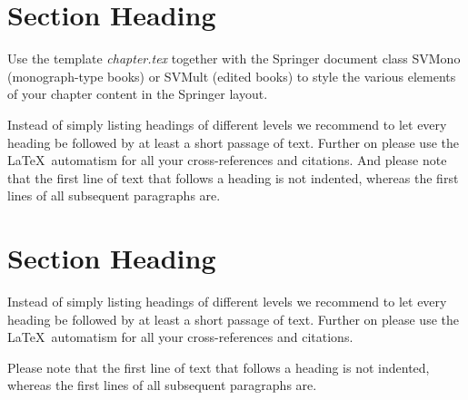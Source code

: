 
\section{Section Heading}
\label{g02:sec:1}
Use the template \emph{chapter.tex} together with the Springer document class SVMono (monograph-type books) or SVMult (edited books) to style the various elements of your chapter content in the Springer layout.

\cite{qca:mraz}


Instead of simply listing headings of different levels we recommend to let every heading be followed by at least a short passage of text. Further on please use the \LaTeX\ automatism for all your cross-references and citations. And please note that the first line of text that follows a heading is not indented, whereas the first lines of all subsequent paragraphs are.

\section{Section Heading}
\label{g02:sec:2}
Instead of simply listing headings of different levels we recommend to let every heading be followed by at least a short passage of text. Further on please use the \LaTeX\ automatism for all your cross-references and citations.

Please note that the first line of text that follows a heading is not indented, whereas the first lines of all subsequent paragraphs are.

